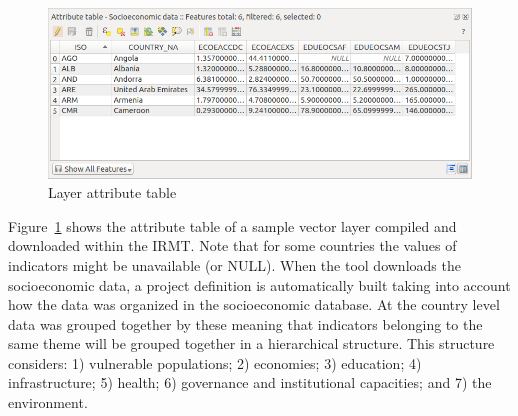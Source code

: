 \begin{figure}
    \centering
    \includegraphics[width=\textwidth]{../images/image11}
    \caption{Layer attribute table}
    \label{fig:attribute_table}
\end{figure}

Figure~\ref{fig:attribute_table} shows the attribute table of a sample vector
layer compiled and downloaded within the IRMT\@. Note that for some countries the
values of indicators might be unavailable (or NULL). When the tool downloads
the socioeconomic data, a project definition is automatically built taking into
account how the data was organized in the socioeconomic database. At the
country level data was grouped together by these meaning that indicators
belonging to the same theme will be grouped together in a hierarchical
structure. This structure considers: 1) vulnerable populations; 2) economies;
3) education; 4) infrastructure; 5) health; 6) governance and institutional
capacities; and 7) the environment.
